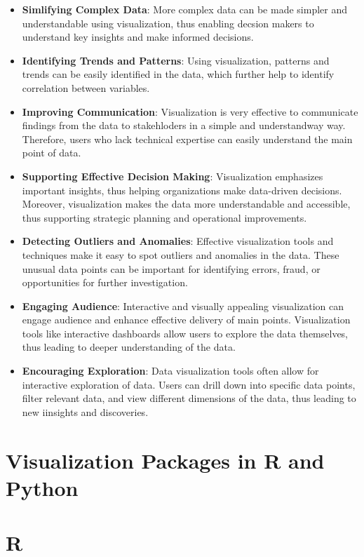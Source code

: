 \documentclass[
  letterpaper,
  DIV=11,
  numbers=noendperiod]{scrreprt}
\begin{document}
\begin{itemize}
\item
  \textbf{Simlifying Complex Data}: More complex data can be made
  simpler and understandable using visualization, thus enabling decsion
  makers to understand key insights and make informed decisions.
\item
  \textbf{Identifying Trends and Patterns}: Using visualization,
  patterns and trends can be easily identified in the data, which
  further help to identify correlation between variables.
\item
  \textbf{Improving Communication}: Visualization is very effective to
  communicate findings from the data to stakehloders in a simple and
  understandway way. Therefore, users who lack technical expertise can
  easily understand the main point of data.
\item
  \textbf{Supporting Effective Decision Making}: Visualization
  emphasizes important insights, thus helping organizations make
  data-driven decisions. Moreover, visualization makes the data more
  understandable and accessible, thus supporting strategic planning and
  operational improvements.
\item
  \textbf{Detecting Outliers and Anomalies}: Effective visualization
  tools and techniques make it easy to spot outliers and anomalies in
  the data. These unusual data points can be important for identifying
  errors, fraud, or opportunities for further investigation.
\item
  \textbf{Engaging Audience}: Interactive and visually appealing
  visualization can engage audience and enhance effective delivery of
  main points. Visualization tools like interactive dashboards allow
  users to explore the data themselves, thus leading to deeper
  understanding of the data.
\item
  \textbf{Encouraging Exploration}: Data visualization tools often allow
  for interactive exploration of data. Users can drill down into
  specific data points, filter relevant data, and view different
  dimensions of the data, thus leading to new iinsights and discoveries.
\end{itemize}

\section{Visualization Packages in R and
Python}\label{visualization-packages-in-r-and-python}

\section{R}
\end{document}
